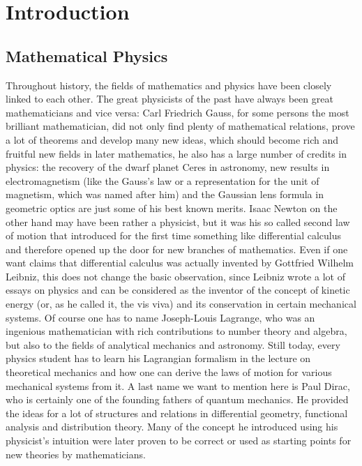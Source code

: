 
%
%

\chapter{Introduction}
\label{sec:Intro}

\section*{Mathematical Physics}
Throughout history, the fields of mathematics and physics have been 
closely linked to each other. The great physicists of the past have always been 
great mathematicians and vice versa: Carl Friedrich Gauss, for some persons the 
most brilliant mathematician, did not only find plenty of mathematical 
relations, prove a lot of theorems and develop many new ideas, which 
should become rich and fruitful new fields in later mathematics, he also has a 
large number of credits in physics: the recovery of the dwarf planet Ceres in 
astronomy, new results in electromagnetism (like the Gauss's law or a 
representation for the unit of magnetism, which was named after him) and the 
Gaussian lens formula in geometric optics are just some of his best known 
merits. Isaac Newton on the other hand may have been rather a physicist, but 
it was his so called second law of motion that introduced for the first time 
something like differential calculus and therefore opened up the door for new 
branches of mathematics. Even if one want claims that differential calculus 
was actually invented by Gottfried Wilhelm Leibniz, this does not change 
the basic observation, since Leibniz wrote a lot of essays on physics and can 
be considered as the inventor of the concept of kinetic energy (or, as he 
called it, the vis viva) and its conservation in certain mechanical 
systems. Of course one has to name Joseph-Louis Lagrange, who was an ingenious 
mathematician with rich contributions to number theory and algebra, but also to 
the fields of analytical mechanics and astronomy. Still today, every physics 
student has to learn his Lagrangian formalism in the lecture on theoretical 
mechanics and how one can derive the laws of motion for various mechanical 
systems from it. A last name we want to mention here is Paul 
Dirac, who is certainly one of the founding fathers of quantum mechanics. He 
provided the ideas for a lot of structures and relations in differential 
geometry, functional analysis and distribution theory. Many of the concept he 
introduced using his physicist's intuition were later proven to be correct or 
used as starting points for new theories by mathematicians.


